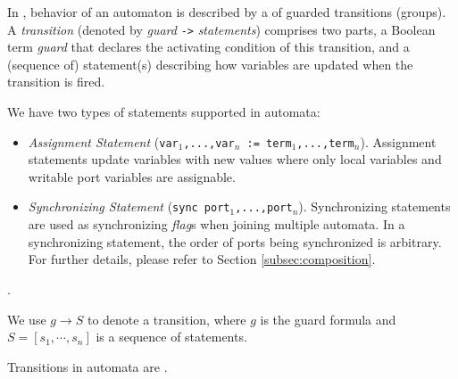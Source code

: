 In \lang{}, behavior of an automaton is described by a  of guarded transitions (groups).
A \emph{transition} (denoted by \emph{guard} \texttt{->} \emph{statements}) comprises two parts, a Boolean term \emph{guard} that declares the activating condition of this transition, and a (sequence of) statement(s) describing how variables are updated when the transition is fired.

We have two types of statements supported in automata:
\begin{itemize}
    \item \emph{Assignment Statement} (\texttt{var$_1$,...,var$_n$ := term$_1$,...,term$_n$}). Assignment statements update variables with new values where only local variables and writable port variables are assignable.
    \item \emph{Synchronizing Statement} (\texttt{sync port$_1$,...,port$_n$}). Synchronizing statements are used as synchronizing \emph{flag}s when joining multiple automata. In a synchronizing statement, the order of ports being synchronized is arbitrary. For further details, please refer to Section \ref{subsec:composition}.
\end{itemize}

.

We use $g\rightarrow S$ to denote a transition, where $g$ is the guard formula and $S=[s_1,\cdots,s_n]$ is a sequence of statements. 

Transitions in \lang{} automata are . 


